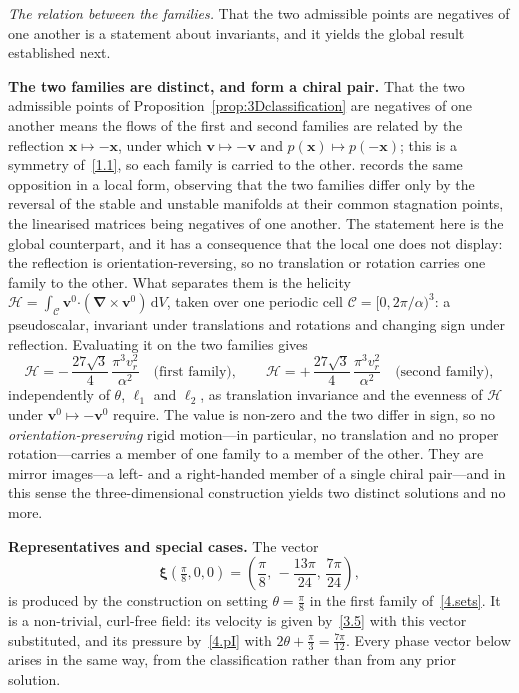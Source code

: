\documentclass[11pt]{jfm}
\providecommand\bnabla{\boldsymbol{\nabla}}
\providecommand\bcdot{\boldsymbol{\cdot}}
\numberwithin{equation}{section}
\begin{document}
\emph{The relation between the families.} That the two admissible points are negatives of one
another is a statement about invariants, and it yields the global result established next.

\noindent\textbf{The two families are distinct, and form a chiral pair.} That the two admissible
points of Proposition~\ref{prop:3Dclassification} are negatives of one another means the flows of
the first and second families are related by the reflection $\boldsymbol{x}\mapsto-\boldsymbol{x}$,
under which $\boldsymbol{v}\mapsto-\boldsymbol{v}$ and $p(\boldsymbol{x})\mapsto p(-\boldsymbol{x})$;
this is a symmetry of~\eqref{1.1}, so each family is carried to the other. \citet{ant} records the
same opposition in a local form, observing that the two families differ only by the reversal of the
stable and unstable manifolds at their common stagnation points, the linearised matrices being
negatives of one another. The statement here is the global counterpart, and it has a consequence
that the local one does not display: the reflection is orientation-reversing, so no translation or
rotation carries one family to the other. What
separates them is the helicity $\mathcal{H}=\int_{\mathcal{C}}\boldsymbol{v}^0\bcdot
(\bnabla\times\boldsymbol{v}^0)\,\mathrm{d}V$, taken over one periodic cell
$\mathcal{C}=[0,2\pi/\alpha)^3$: a pseudoscalar, invariant under translations and rotations and
changing sign under reflection. Evaluating it on the two families gives
\begin{equation}
\label{4.helicity}
\mathcal{H}=-\,\frac{27\sqrt{3}}{4}\,\frac{\pi^3 v_r^2}{\alpha^2}\quad\text{(first family)},
\qquad
\mathcal{H}=+\,\frac{27\sqrt{3}}{4}\,\frac{\pi^3 v_r^2}{\alpha^2}\quad\text{(second family)},
\end{equation}
independently of $\theta$, $\ell_1$ and $\ell_2$, as translation invariance and the evenness of
$\mathcal{H}$ under $\boldsymbol{v}^0\mapsto-\boldsymbol{v}^0$ require. The value is non-zero and the two
differ in sign, so no \emph{orientation-preserving} rigid motion---in particular, no translation
and no proper rotation---carries a member of one family to a member of the other. They
are mirror images---a left- and a right-handed member of a single chiral pair---and in this sense
the three-dimensional construction yields two distinct solutions and no more.

\medskip
\noindent\textbf{Representatives and special cases.} The vector
\[
\boldsymbol{\xi}\!\left(\tfrac{\pi}{8},0,0\right)
=\left(\frac{\pi}{8},\,-\frac{13\pi}{24},\,\frac{7\pi}{24}\right),
\]
is produced by the construction on setting $\theta=\tfrac{\pi}{8}$ in the first family
of~\eqref{4.sets}. It is a non-trivial, curl-free field: its velocity is given by~\eqref{3.5} with
this vector substituted, and its pressure by~\eqref{4.pI} with
$2\theta+\tfrac{\pi}{3}=\tfrac{7\pi}{12}$. Every phase vector below arises in the same way, from
the classification rather than from any prior solution.
\end{document}
